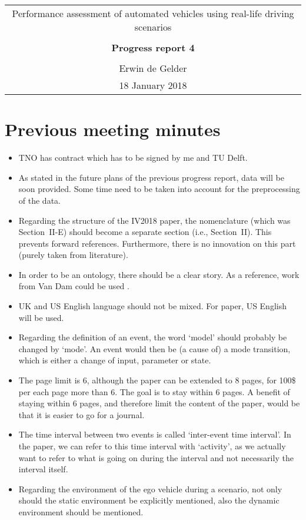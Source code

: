 \documentclass[10pt,final,a4paper,oneside,onecolumn]{article}
\newcommand{\progressreportnumber}{4}
\renewcommand{\author}{Erwin de Gelder}
\renewcommand{\date}{18 January 2018}
\renewcommand{\title}{Performance assessment of automated vehicles using real-life driving scenarios}
\begin{document}
	
\begin{center}
	\begin{tabular}{c}
		\title \\ \\
		\textbf{\huge Progress report \progressreportnumber} \\ \\
		\author \\ 
		\date
	\end{tabular}
\end{center}

\section{Previous meeting minutes}
\begin{itemize}
	\item TNO has contract which has to be signed by me and TU Delft.
	\item As stated in the future plans of the previous progress report, data will be soon provided. Some time need to be taken into account for the preprocessing of the data.
	\item Regarding the structure of the IV2018 paper, the nomenclature (which was Section~II-E) should become a separate section (i.e., Section~II). This prevents forward references. Furthermore, there is no innovation on this part (purely taken from literature).
	\item In order to be an ontology, there should be a clear story. As a reference, work from Van Dam could be used \cite{vanDamPhDThesis2009}.
	\item UK and US English language should not be mixed. For paper, US English will be used.
	\item Regarding the definition of an event, the word `model' should probably be changed by `mode'. An event would then be (a cause of) a mode transition, which is either a change of input, parameter or state. 
	\item The page limit is 6, although the paper can be extended to 8 pages, for 100\$ per each page more than 6. The goal is to stay within 6 pages. A benefit of staying within 6 pages, and therefore limit the content of the paper, would be that it is easier to go for a journal.
	\item The time interval between two events is called `inter-event time interval'. In the paper, we can refer to this time interval with `activity', as we actually want to refer to what is going on during the interval and not necessarily the interval itself.
	\item Regarding the environment of the ego vehicle during a scenario, not only should the static environment be explicitly mentioned, also the dynamic environment should be mentioned. 
\end{itemize}
\end{document}
